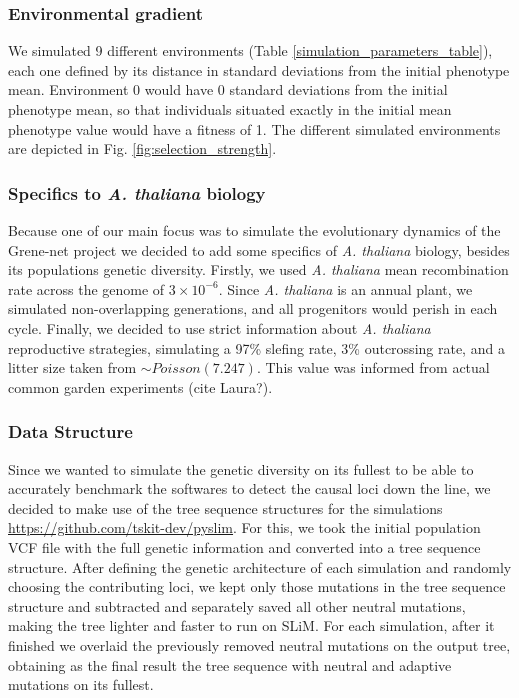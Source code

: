 \documentclass{article}
\begin{document}
\subsubsection{Environmental gradient}
We simulated 9 different environments (Table \ref{simulation_parameters_table}), each one defined by its distance in standard deviations from the initial phenotype mean. Environment 0 would have 0 standard deviations from the initial phenotype mean, so that individuals situated exactly in the initial mean phenotype value would have a fitness of 1. The different simulated environments are depicted in Fig. \ref{fig:selection_strength}. 

\subsubsection{Specifics to \textit{A. thaliana} biology}
Because one of our main focus was to simulate the evolutionary dynamics of the Grene-net project we decided to add some specifics of \textit{A. thaliana} biology, besides its populations genetic diversity. Firstly, we used \textit{A. thaliana} mean recombination rate across the genome of $3 \times 10^{-6}$. Since \textit{A. thaliana} is an annual plant, we simulated non-overlapping generations, and all progenitors would perish in each cycle. Finally, we decided to use strict information about \textit{A. thaliana} reproductive strategies, simulating a 97\% slefing rate, 3\% outcrossing rate, and a litter size taken from $\sim Poisson(7.247)$. This value was informed from actual common garden experiments (cite Laura?). 

\subsubsection{Data Structure}
Since we wanted to simulate the genetic diversity on its fullest to be able to accurately benchmark the softwares to detect the causal loci down the line, we decided to make use of the tree sequence structures for the simulations \url{https://github.com/tskit-dev/pyslim}. For this, we took the initial population VCF file with the full genetic information and converted into a tree sequence structure. After defining the genetic architecture of each simulation and randomly choosing the contributing loci, we kept only those mutations in the tree sequence structure and subtracted and separately saved all other neutral mutations, making the tree lighter and faster to run on SLiM. For each simulation, after it finished we overlaid the previously removed neutral mutations on the output tree, obtaining as the final result the tree sequence with neutral and adaptive mutations on its fullest. 
\end{document}

